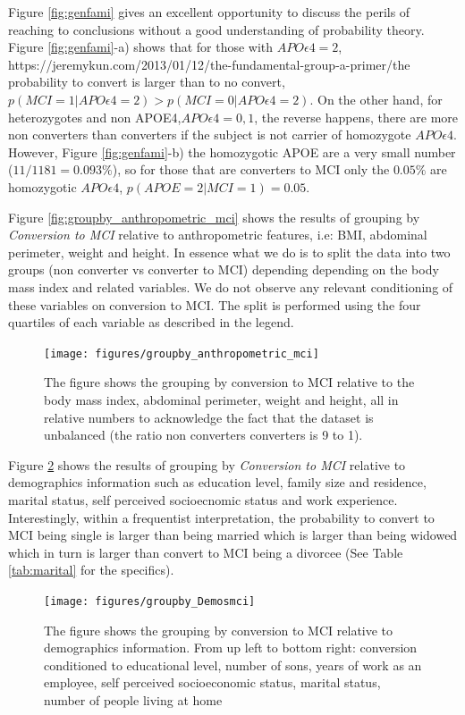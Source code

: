 \documentclass[11pt]{article}
\theoremstyle{definition}
\theoremstyle{remark}
\begin{document}
Figure \ref{fig:genfami} gives an excellent opportunity to discuss the perils of reaching to conclusions without a good understanding of probability theory. 
Figure \ref{fig:genfami}-a) shows that for those with $APO\epsilon4=2$, https://jeremykun.com/2013/01/12/the-fundamental-group-a-primer/the probability to convert is larger than to no convert,$p(MCI=1|APO\epsilon4=2) > p(MCI=0|APO\epsilon4=2)$. On the other hand, for heterozygotes and non APOE4,$APO\epsilon4=0,1$, the reverse happens, there are more non converters than converters if the subject is not carrier of homozygote $APO\epsilon4$. 
However, Figure \ref{fig:genfami}-b) the homozygotic APOE are a very small number ($11/1181 = 0.093\%$), so for those that are converters to MCI only the $0.05\%$ are homozygotic $APO\epsilon4$, $p(APOE=2|MCI=1)=0.05$.

Figure \ref{fig:groupby_anthropometric_mci} shows the results of grouping by \emph{Conversion to MCI} relative to anthropometric features, i.e: BMI, abdominal perimeter, weight and height. In essence what we do is to split the data into two groups (non converter vs converter to MCI) depending depending on the body mass index and related variables. We do not observe any relevant conditioning of these variables on conversion to MCI. The split is performed using the four quartiles of each variable as described in the legend.

\begin{figure}[H]
        \centering
        \texttt{[image: figures/groupby\_anthropometric\_mci]}
        \caption{The figure shows the grouping by conversion to MCI relative to the body mass index, abdominal perimeter, weight and height, all in relative numbers to acknowledge the fact that the dataset is unbalanced (the ratio non converters converters is 9 to 1). } 
        \label{fig:groupby_genetics_mci}
\end{figure}

Figure \ref{fig:groupby_Demosmci} shows the results of grouping by \emph{Conversion to MCI} relative to demographics information such as education level, family size and residence, marital status, self perceived socioecnomic status and work experience. Interestingly, within a frequentist interpretation, the probability to convert to MCI being single is larger than being married which is larger than being widowed which in turn is larger than convert to MCI being a divorcee (See Table \ref{tab:marital} for the specifics). 

\begin{figure}[H]
        \centering
        \texttt{[image: figures/groupby\_Demosmci]}
        \caption{The figure shows the grouping by conversion to MCI relative to demographics information. From up left to bottom right: conversion conditioned to educational level, number of sons, years of work as an employee, self perceived socioeconomic status, marital status, number of people living at home } 
        \label{fig:groupby_Demosmci}
\end{figure}
\end{document}
